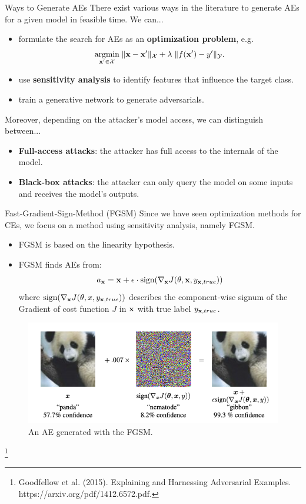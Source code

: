 \documentclass[11pt,compress,t,notes=noshow, xcolor=table]{beamer}
\begin{document}
\begin{vbframe}{Ways to Generate AEs}
There exist various ways in the literature to generate AEs for a given model in feasible time. We can...
\begin{itemize}
    \item formulate the search for AEs as an \textbf{optimization problem}, e.g. 
    \begin{equation*}
        \label{eq:optimization}
        \underset{\xv'\in \Xspace}{\text{argmin}}\; \| \xv-\xv' \|_{\Xspace}+\lambda\;    \|f(\xv')-y'\|_{\Yspace}.
    \end{equation*}
    \item use \textbf{sensitivity analysis} to identify features that influence the target class.
    \item train a generative network to generate adversarials.
\end{itemize}
Moreover, depending on the attacker's model access, we can distinguish between...
\begin{itemize}
    \item \textbf{Full-access attacks}: the attacker has full access to the internals of the model.
    \item \textbf{Black-box attacks}: the attacker can only query the model on some inputs and receives the model's outputs.
\end{itemize}
\end{vbframe}

\begin{vbframe}{Fast-Gradient-Sign-Method (FGSM)}
Since we have seen optimization methods for CEs, we focus on a method using sensitivity analysis, namely FGSM.
\begin{itemize}
    \item FGSM is based on the linearity hypothesis.
    \item FGSM finds AEs from:
    \begin{equation*}
        a_{\xv}=\xv+\epsilon\cdot\text{sign}(\nabla_{\xv} J(\theta,\xv,y_{\xv,true}))
    \end{equation*}
    where $\text{sign}(\nabla_{\xv} J(\theta,x,y_{\xv,true}))$ describes the component-wise signum of the Gradient of cost function $J$ in $\xv$ with true label $y_{\xv,true}$.
\end{itemize}
\begin{figure}[h]
\centering
\includegraphics[width=0.5\linewidth]{figure/AEpanda.png}
  \caption{An AE generated with the FGSM.}
  \label{fig:mnist}
\end{figure} 
\vspace{-0.6cm}
\footnote[frame]{Goodfellow et al. (2015). Explaining and Harnessing Adversarial Examples. https://arxiv.org/pdf/1412.6572.pdf.}
\end{vbframe}
\end{document}
